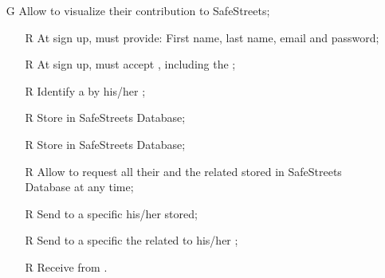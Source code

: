 \documentclass[../../../rasd.tex]{subfiles}
\begin{document}
\begin{itemize}
	\item[G\subs{8}]Allow  to visualize their contribution to SafeStreets;
	\begin{itemize}
		\item[R\subs{1}]At sign up,  must provide: First name, last name, email and password;
		\item[R\subs{2}]At sign up,  must accept , including the ;
		\item[R\subs{3}]Identify a  by his/her ;
		\item[R\subs{10}]Store  in SafeStreets Database;
		\item[R\subs{12}]Store  in SafeStreets Database;
		\item[R\subs{20}]Allow  to request all their  and the related  stored in SafeStreets Database at any time;
		\item[R\subs{21}]Send to a specific  his/her  stored;
		\item[R\subs{22}]Send to a specific  the  related to his/her ;
		\item[R\subs{33}]Receive  from .	
	\end{itemize}

\end{itemize}
\end{document}
